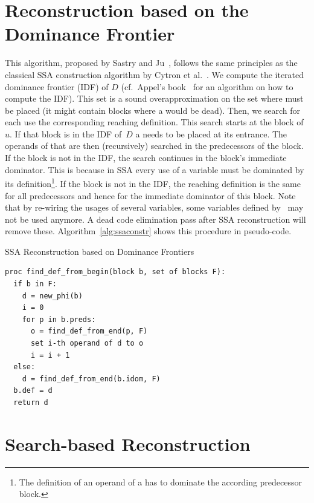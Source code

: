 \section{Reconstruction based on the Dominance Frontier}
This algorithm, proposed by Sastry and Ju~\cite{sastry98}, follows the same principles as the classical SSA construction algorithm by Cytron et al.~\cite{cytron:1991:ssa}.
We compute the iterated dominance frontier (IDF) of $D$ (cf.~Appel's book~\cite{appel:2002:modern} for an algorithm on how to compute the IDF).
This set is a sound overapproximation on the set where \phiops{} must be placed (it might contain blocks where a \phiop{} would be dead).
Then, we search for each use the corresponding reaching definition.
This search starts at the block of~$u$.
If that block is in the IDF of~$D$ a \phiop{} needs to be placed at its entrance.
The operands of that \phiop{} are then (recursively) searched in the predecessors of the block.
If the block is not in the IDF, the search continues in the block's immediate dominator. 
This is because in SSA every use of a variable must be dominated by its definition\footnote{The definition of an operand of a \phiop{} has to dominate the according predecessor block.}.
If the block is not in the IDF, the reaching definition is the same for all predecessors and hence for the immediate dominator of this block.
Note that by re-wiring the usages of several variables, some variables defined by \phiops\ may not be used anymore.
A dead code elimination pass after SSA reconstruction will remove these. 
Algorithm~\ref{alg:ssaconstr} shows this procedure in pseudo-code.

\begin{algorithm}
  \caption{SSA Reconstruction based on Dominance Frontiers}
  \label{alg:ssaconstr}
\begin{verbatim}
proc find_def_from_begin(block b, set of blocks F):
  if b in F:
    d = new_phi(b)
    i = 0
    for p in b.preds: 
      o = find_def_from_end(p, F)
      set i-th operand of d to o
      i = i + 1
  else:
    d = find_def_from_end(b.idom, F)
  b.def = d
  return d
\end{verbatim}
\end{algorithm}

\section{Search-based Reconstruction}

